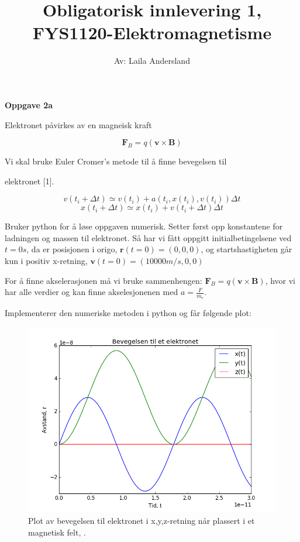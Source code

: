 \documentclass[a4paper,norsk,12pt]{article}
\title{\vspace{-4.0cm} \textbf{Obligatorisk innlevering 1, FYS1120-Elektromagnetisme}}
\author{Av: Laila Andersland}
\begin{document}
\maketitle

\textbf{Oppgave 2a}

Elektronet påvirkes av en magneisk kraft 

$$ \textbf{F}_{B} = q ( \textbf{v} \times \textbf{B} ) $$

Vi skal bruke Euler Cromer's metode til å finne bevegelsen til 

elektronet [1].

$$ v(t_i + \Delta t)\simeq v(t_i) + a(t_i , x(t_i) , v(t_i)) \Delta t $$
$$ x(t_i + \Delta t) \simeq x(t_i) + v(t_i + \Delta t) \Delta t $$

\vspace{5mm}

Bruker python for å løse oppgaven numerisk. Setter først opp konstantene for ladningen og massen til elektronet. Så har vi fått oppgitt initialbetingelsene ved $ t = 0 s$, da er posisjonen i origo, $ \textbf{r}(t=0) = (0,0,0) $, og startshastigheten går kun i positiv x-retning, $ \textbf{v}(t=0) = (10 000 m/s,0,0) $

For å finne akselerasjonen må vi bruke sammenhengen: $ \textbf{F}_{B} = q ( \textbf{v} \times \textbf{B} ) $, hvor vi har alle verdier og kan finne akselesjonenen med $ a = \frac{F}{m_e} $. 

\vspace{5mm}

Implementerer den numeriske metoden i python og får følgende plot:

\begin{figure}[H]
  \includegraphics[width=\linewidth]{oppgave21.png}
  \caption{Plot av bevegelsen til elektronet i x,y,z-retning når plassert i et magnetisk felt, .}
  \label{fig:plot1}
\end{figure}
\end{document}
